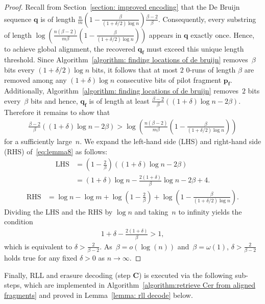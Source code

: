 \documentclass[journal,letterpaper,onecolumn,11pt]{IEEEtran}
\newcommand{\boldf}{\mathbf{f}}
\newcommand{\boldp}{\mathbf{p}}
\begin{document}
\begin{proof}
    Recall from Section~\ref{section: improved encoding} that the De Bruijn sequence $\mathbf{q}$ is of length $\frac{n}{m}(1-\frac{\beta}{(1+\delta/2)\log n})\frac{\beta-2}{\beta}$. Consequently, every substring of length $\log(\frac{n(\beta-2)}{m\beta}(1-\frac{\beta}{(1+\delta/2)\log n}))$ appears in $\mathbf{q}$ exactly once.    
    Hence, to achieve global alignment, the recovered $\mathbf{q}_{\boldf}$ must exceed this unique length threshold.
    Since Algorithm~\ref{algorithm: finding locations of de bruijn} removes~$\beta$ bits every $(1+\delta/2)\log n$ bits, it follows that at most $2$ $0$-runs of length $\beta$ are removed among any $(1+\delta)\log n$ consecutive bits of pilot fragment $\boldp_\boldf$.
    Additionally, Algorithm~\ref{algorithm: finding locations of de bruijn} removes~$2$ bits every~$\beta$ bits and hence,  $\mathbf{q}_{\boldf}$ is of length at least $\frac{\beta-2}{\beta}((1+\delta)\log n-2\beta)$.
    Therefore it remains to show that 
    \begin{align}\label{eq:lemma8}
        \frac{\beta-2}{\beta}((1+\delta)\log n-2\beta) > \log\left(\frac{n(\beta-2)}{m\beta}\left(1-\frac{\beta}{(1+\delta/2)\log n}\right)\right)
    \end{align}
    for a sufficiently large~$n$.
    We expand the left-hand side (LHS) and right-hand side (RHS) of~\eqref{eq:lemma8} as follows:
    \begin{align*}
        \text{LHS} &= \left(1 - \frac{2}{\beta}\right)\left((1+\delta)\log n - 2\beta\right) \\
        &= (1+\delta)\log n - \frac{2(1+\delta)}{\beta}\log n - 2\beta + 4.
    \end{align*}
    \begin{align*}
        \text{RHS} &= \log n - \log m + \log\left(1 - \frac{2}{\beta}\right) + \log\left(1 - \frac{\beta}{(1+\delta/2)\log n}\right).
    \end{align*}
    Dividing the LHS and the RHS by $\log n$ and taking~$n$ to infinity yields the condition
    \begin{align*}
        1+\delta-\frac{2(1+\delta)}{\beta} > 1,
    \end{align*}
    which is equivalent to $\delta > \frac{2}{\beta-2}$.
    As~$\beta=o(\log(n))$ and~$\beta=\omega(1)$, $\delta > \frac{2}{\beta-2}$ holds true for any fixed $\delta > 0$ as $n\to\infty$.
\end{proof}

Finally, RLL and erasure decoding (step \textbf{C}) is executed via the following sub-steps, which are implemented in Algorithm~\ref{algorithm:retrieve Cer from aligned fragments} and proved in Lemma~\ref{lemma: rll decode} below.
\end{document}
